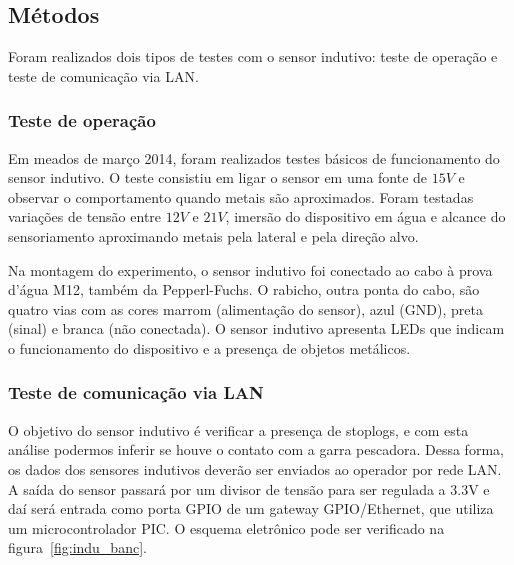 


\subsection{Métodos}
Foram realizados dois tipos de testes com o sensor indutivo: teste de
operação e teste de comunicação via LAN.

\subsubsection{Teste de operação}
Em meados de março 2014, foram realizados testes básicos de funcionamento do
sensor indutivo. O teste consistiu em ligar o sensor em uma fonte de $15V$ e
observar o comportamento quando metais são aproximados. Foram testadas variações
de tensão entre $12V$ e $21V$, imersão do dispositivo em água e alcance do
sensoriamento aproximando metais pela lateral e pela direção alvo.

Na montagem do experimento, o sensor indutivo foi conectado ao cabo à prova
d'água M12, também da Pepperl-Fuchs. O rabicho, outra ponta do cabo, são quatro
vias com as cores marrom (alimentação do sensor), azul (GND), preta (sinal) e
branca (não conectada). O sensor indutivo apresenta LEDs que indicam o
funcionamento do dispositivo e a presença de objetos metálicos.

\subsubsection{Teste de comunicação via LAN}
O objetivo do sensor indutivo é verificar a presença de stoplogs, e com esta
análise podermos inferir se houve o contato com a garra pescadora. Dessa forma,
os dados dos sensores indutivos deverão ser enviados ao operador por rede LAN.
A saída do sensor passará por um divisor de tensão para ser regulada a 3.3V e
daí será entrada como porta GPIO de um gateway GPIO/Ethernet, que utiliza um
microcontrolador PIC. O esquema eletrônico pode ser verificado na
figura~\ref{fig:indu_banc}.

